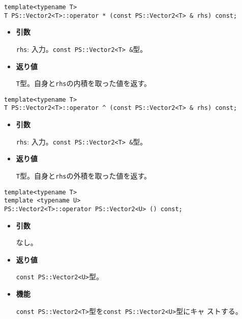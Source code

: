 
\begin{screen}
\begin{verbatim}
template<typename T>
T PS::Vector2<T>::operator * (const PS::Vector2<T> & rhs) const;
\end{verbatim}
\end{screen}

\begin{itemize}

\item{{\bf 引数}}

{\tt rhs}: 入力。{\tt const PS::Vector2<T> \&}型。

\item{{\bf 返り値}}

{\tt T}型。自身と{\tt rhs}の内積を取った値を返す。

\end{itemize}

\begin{screen}
\begin{verbatim}
template<typename T>
T PS::Vector2<T>::operator ^ (const PS::Vector2<T> & rhs) const;
\end{verbatim}
\end{screen}

\begin{itemize}

\item{{\bf 引数}}

{\tt rhs}: 入力。{\tt const PS::Vector2<T> \&}型。

\item{{\bf 返り値}}

{\tt T}型。自身と{\tt rhs}の外積を取った値を返す。

\end{itemize}


\begin{screen}
\begin{verbatim}
template<typename T>
template <typename U>
PS::Vector2<T>::operator PS::Vector2<U> () const;
\end{verbatim}
\end{screen}

\begin{itemize}

\item{{\bf 引数}}

  なし。

\item{{\bf 返り値}}

  {\tt const PS::Vector2<U>}型。

\item{{\bf 機能}}

  {\tt const PS::Vector2<T>}型を{\tt const PS::Vector2<U>}型にキャ
  ストする。

\end{itemize}



